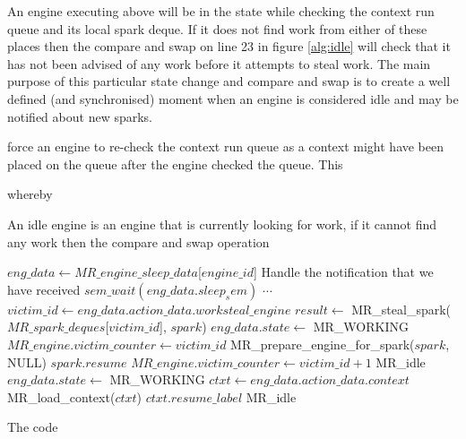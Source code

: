 An engine executing \idle above will be in the  state while
checking the context run queue and its local spark deque.
If it does not find work from either of these places then the compare and
swap on line 23 in figure \ref{alg:idle} will check that it has not been
advised of any work before it attempts to steal work.
The main purpose of this particular state change and compare and swap
is to create a well defined (and synchronised) moment when an engine
is considered idle and may be notified about new sparks.


force an engine to re-check the context run queue as a context might
have been placed on the queue after the engine checked the queue.
This 


whereby 

An idle engine is an engine that is currently looking for work,
if it cannot find any work then the compare and swap operation 

\begin{algorithm}
\begin{algorithmic}
        \State $eng\_data \gets MR\_engine\_sleep\_data$[$engine\_id$]
            \State Handle the notification that we have received
        \EndIf
        \State $sem\_wait(eng\_data.sleep_sem)$
            \State $\cdots$
          \EndCase
            \State $victim\_id \gets
                eng\_data.action\_data.worksteal\_engine$
            \Repeat
                \State $result \gets$
                    MR\_steal\_spark($MR\_spark\_deques$[$victim\_id$],
                        \text{\code{\&}}$spark$)
                \State $eng\_data.state \gets$ MR\_WORKING
                \State $MR\_engine.victim\_counter \gets victim\_id$
                \State MR\_prepare\_engine\_for\_spark($spark$, NULL)
                \Goto $spark.resume$
            \Else {}
                \State $MR\_engine.victim\_counter \gets victim\_id + 1$
                \Goto MR\_idle
            \EndIf
          \EndCase
            \State $eng\_data.state \gets$ MR\_WORKING
            \State $ctxt \gets eng\_data.action\_data.context$
            \State MR\_load\_context($ctxt$)
            \Goto $ctxt.resume\_label$
          \EndCase
            \Goto MR\_idle
          \EndCase
        \EndSwitch
    \EndProcedure
\end{algorithmic}
\caption{The \sleep code}
\end{algorithm}

